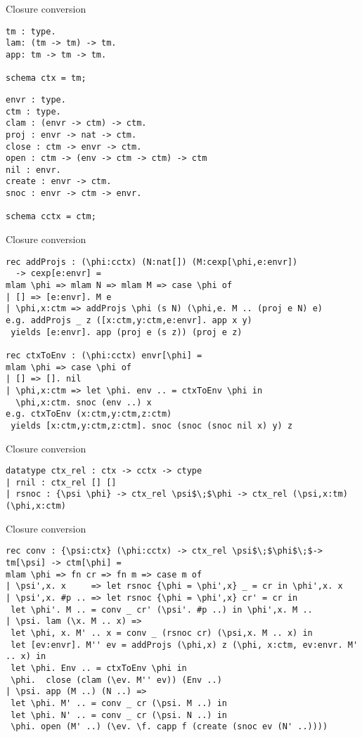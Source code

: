 \documentclass{beamer}
\begin{document}
\begin{frame}[fragile]{Closure conversion}

\begin{lstlisting}
tm : type.
lam: (tm -> tm) -> tm.              
app: tm -> tm -> tm.

schema ctx = tm;
\end{lstlisting}

\begin{lstlisting}
envr : type.
ctm : type.
clam : (envr -> ctm) -> ctm.
proj : envr -> nat -> ctm.
close : ctm -> envr -> ctm.
open : ctm -> (env -> ctm -> ctm) -> ctm
nil : envr.
create : envr -> ctm.
snoc : envr -> ctm -> envr.

schema cctx = ctm;
\end{lstlisting}
\end{frame}

\begin{frame}[fragile]{Closure conversion}

\begin{lstlisting}
rec addProjs : (\phi:cctx) (N:nat[]) (M:cexp[\phi,e:envr])
  -> cexp[e:envr] =
mlam \phi => mlam N => mlam M => case \phi of
| [] => [e:envr]. M e
| \phi,x:ctm => addProjs \phi (s N) (\phi,e. M .. (proj e N) e)
e.g. addProjs _ z ([x:ctm,y:ctm,e:envr]. app x y)
 yields [e:envr]. app (proj e (s z)) (proj e z)

rec ctxToEnv : (\phi:cctx) envr[\phi] =
mlam \phi => case \phi of
| [] => []. nil
| \phi,x:ctm => let \phi. env .. = ctxToEnv \phi in
  \phi,x:ctm. snoc (env ..) x
e.g. ctxToEnv (x:ctm,y:ctm,z:ctm)
 yields [x:ctm,y:ctm,z:ctm]. snoc (snoc (snoc nil x) y) z

\end{lstlisting}
\end{frame}

\begin{frame}[fragile]{Closure conversion}
\begin{lstlisting}
datatype ctx_rel : ctx -> cctx -> ctype
| rnil : ctx_rel [] []
| rsnoc : {\psi \phi} -> ctx_rel \psi$\;$\phi -> ctx_rel (\psi,x:tm) (\phi,x:ctm)
\end{lstlisting}
\end{frame}
\begin{frame}[fragile]{Closure conversion}
\begin{lstlisting}
rec conv : {\psi:ctx} (\phi:cctx) -> ctx_rel \psi$\;$\phi$\;$-> tm[\psi] -> ctm[\phi] =
mlam \phi => fn cr => fn m => case m of
| \psi',x. x     => let rsnoc {\phi = \phi',x} _ = cr in \phi',x. x
| \psi',x. #p .. => let rsnoc {\phi = \phi',x} cr' = cr in 
 let \phi'. M .. = conv _ cr' (\psi'. #p ..) in \phi',x. M ..
| \psi. lam (\x. M .. x) =>
 let \phi, x. M' .. x = conv _ (rsnoc cr) (\psi,x. M .. x) in
 let [ev:envr]. M'' ev = addProjs (\phi,x) z (\phi, x:ctm, ev:envr. M' .. x) in
 let \phi. Env .. = ctxToEnv \phi in 
 \phi.  close (clam (\ev. M'' ev)) (Env ..)
| \psi. app (M ..) (N ..) =>
 let \phi. M' .. = conv _ cr (\psi. M ..) in
 let \phi. N' .. = conv _ cr (\psi. N ..) in
 \phi. open (M' ..) (\ev. \f. capp f (create (snoc ev (N' ..))))
\end{lstlisting}
\end{frame}
\end{document}
